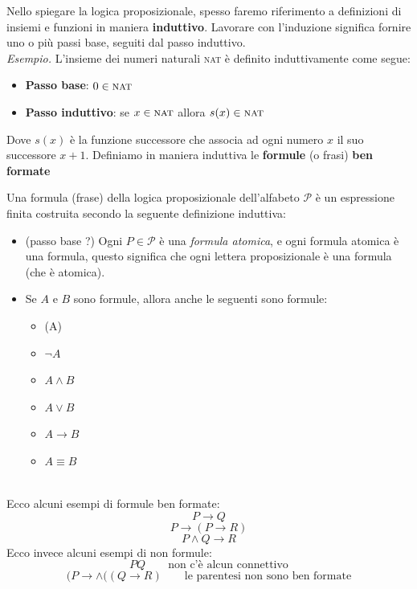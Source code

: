    Nello spiegare la logica proposizionale, spesso faremo riferimento a definizioni di insiemi e funzioni in maniera \textbf{induttivo}.
   Lavorare con l'induzione significa fornire uno o più passi base, seguiti dal passo induttivo.\smallskip\\
   \textit{Esempio.} L'insieme dei numeri naturali \textsc{nat} è definito induttivamente come segue:
   \begin{itemize}
    \item \textbf{Passo base}: $0 \in \textsc{nat}$
    \item \textbf{Passo induttivo}: se $x\in \textsc{nat}$ allora $s(x) \in \textsc{nat}$
   \end{itemize}
   Dove $s(x)$ è la funzione successore che associa ad ogni numero $x$ il suo successore $x +1$.\newpage
   \noindent Definiamo in maniera induttiva le \textbf{formule} (o frasi) \textbf{ben formate}\smallskip\\
\colorbox{SALZO}{\parbox{\dimexpr\linewidth-2\fboxsep}{\begin{definition}
   Una formula (frase) della logica proposizionale dell'alfabeto $\mathcal{P}$ è un espressione finita costruita secondo la seguente
   definizione induttiva:
   \begin{itemize}
    \item (passo base ?) Ogni $P \in \mathcal{P}$ è una \textit{formula atomica}, e ogni formula atomica è una formula,
    questo significa che ogni lettera proposizionale è una formula (che è atomica).
    \item Se $A$ e $B$ sono formule, allora anche le seguenti sono formule:
    \begin{itemize}
        \item (A)
        \item $\neg A$
        \item $A \wedge B$
        \item $A \vee B$
        \item $A \to B$
        \item $A \equiv B$
    \end{itemize}
   \end{itemize}
\end{definition}}}\smallskip\\
Ecco alcuni esempi di formule ben formate:
\[  P \to Q    \]
\[  P \to (P \to R)    \]
\[   P \wedge Q \to R   \]
Ecco invece alcuni esempi di non formule:
\[  PQ \qquad \text{non c'è alcun connettivo}    \]
\[  (P \to \wedge ((Q \to R)  \qquad \text{le parentesi non sono ben formate}  \]
